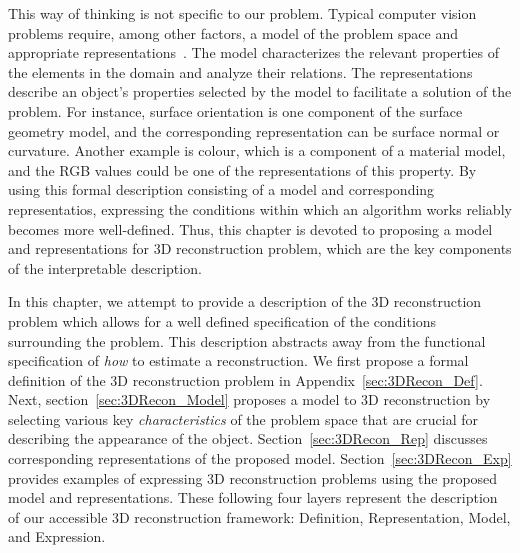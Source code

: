 
This way of thinking is not specific to our problem. Typical computer vision problems require, among other factors, a model of the problem space and appropriate representations~\cite{little1985phdthesis}. The model characterizes the relevant properties of the elements in the domain and analyze their relations. The representations describe an object's properties selected by the model to facilitate a solution of the problem. For instance, surface orientation is one component of the surface geometry model, and the corresponding representation can be surface normal or curvature. Another example is colour, which is a component of a material model, and the RGB values could be one of the representations of this property. By using this formal description consisting of a model and corresponding representatios, expressing the conditions within which an algorithm works reliably becomes more well-defined. Thus, this chapter is devoted to proposing a model and representations for 3D reconstruction problem, which are the key components of the interpretable description.

In this chapter, we attempt to provide a description of the 3D reconstruction problem which allows for a well defined specification of the conditions surrounding the problem. This description abstracts away from the functional specification of \textit{how} to estimate a reconstruction. We first propose a formal definition of the 3D reconstruction problem in Appendix~\ref{sec:3DRecon_Def}. Next, section~\ref{sec:3DRecon_Model} proposes a model to 3D reconstruction by selecting various key \textit{characteristics} of the problem space that are crucial for describing the appearance of the object. Section~\ref{sec:3DRecon_Rep} discusses corresponding representations of the proposed model. Section~\ref{sec:3DRecon_Exp} provides examples of expressing 3D reconstruction problems using the proposed model and representations. These following four layers represent the description of our accessible 3D reconstruction framework: Definition, Representation, Model, and Expression.

